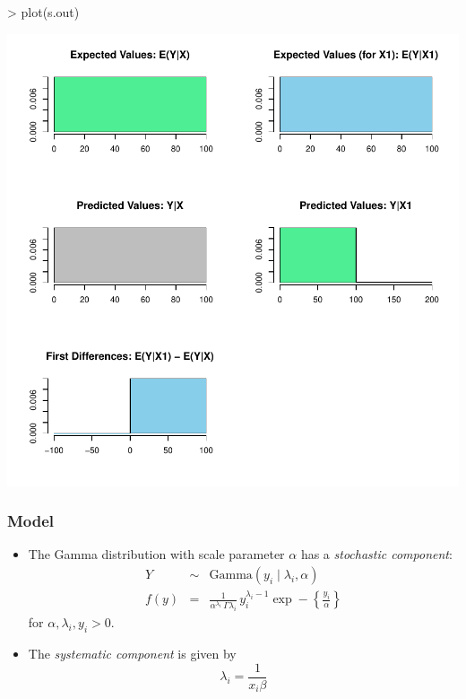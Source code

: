 \documentclass{article}
\begin{document}
\begin{center}
\begin{Schunk}
\begin{Sinput}
> plot(s.out)
\end{Sinput}
\end{Schunk}
\includegraphics{vigpics/gamma-ExamplePlot}
\end{center}

\subsubsection{Model}

\begin{itemize}
\item The Gamma distribution with scale parameter $\alpha$ has a
\emph{stochastic component}:
\begin{eqnarray*}
Y &\sim& \textrm{Gamma}(y_i \mid \lambda_i, \alpha) \\
f(y)  &=& \frac{1}{\alpha^{\lambda_i} \, \Gamma \lambda_i} \, y_i^{\lambda_i
  - 1} \exp -\left\{ \frac{y_i}{\alpha} \right\}
\end{eqnarray*}
for $\alpha, \lambda_i, y_i > 0$.  \\

\item The \emph{systematic component} is given by
\begin{equation*}
  \lambda_i = \frac{1}{x_i \beta}
\end{equation*}
\end{itemize}
\end{document}
